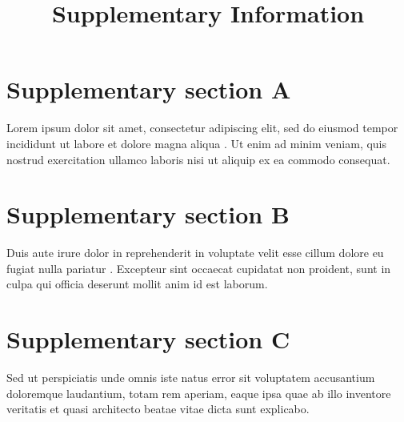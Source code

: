 \documentclass[10pt]{article}
\title{Supplementary Information}
\author{}
\date{}
\begin{document}
\maketitle

\section{Supplementary section A}
\label{sec.si_gpe}
Lorem ipsum dolor sit amet, consectetur adipiscing elit, sed do eiusmod tempor incididunt ut labore et dolore magna aliqua \cite{vassiliadis2024non}. Ut enim ad minim veniam, quis nostrud exercitation ullamco laboris nisi ut aliquip ex ea commodo consequat.

\section{Supplementary section B}
\label{sec.si_nef}
Duis aute irure dolor in reprehenderit in voluptate velit esse cillum dolore eu fugiat nulla pariatur \cite{trevismd_statannotations}. Excepteur sint occaecat cupidatat non proident, sunt in culpa qui officia deserunt mollit anim id est laborum.

\section{Supplementary section C}
\label{sec.si_fitting}
Sed ut perspiciatis unde omnis iste natus error sit voluptatem accusantium doloremque laudantium, totam rem aperiam, eaque ipsa quae ab illo inventore veritatis et quasi architecto beatae vitae dicta sunt explicabo.

\printbibliography
\end{document}
